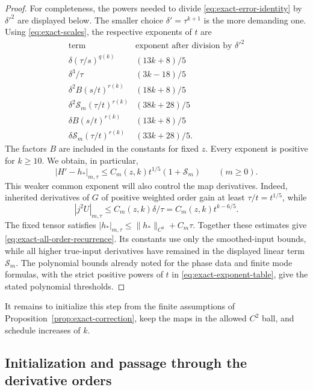 \begin{proof}
For completeness, the powers needed to divide
\eqref{eq:exact-error-identity} by $\delta'^2$ are displayed below.
The smaller choice $\delta'=\tau^{k+1}$ is the more demanding one.
Using \eqref{eq:exact-scales}, the respective exponents of $t$ are
\begin{equation}\label{eq:exact-exponent-table}
\begin{array}{c|c}
 \text{term}&\text{exponent after division by }\delta'^2\\ \hline
 \delta(\tau/s)^{q(k)}&(13k+8)/5\\
 \delta^3/\tau&(3k-18)/5\\
 \delta^2 B(s/t)^{r(k)}&(18k+8)/5\\
 \delta^2\mathcal S_m(\tau/t)^{r(k)}&(38k+28)/5\\
 \delta B(s/t)^{r(k)}&(13k+8)/5\\
 \delta\mathcal S_m(\tau/t)^{r(k)}&(33k+28)/5.
\end{array}
\end{equation}
The factors $B$ are included in the constants for fixed $z$.
Every exponent is positive for $k\ge10$.  We obtain, in particular,
\begin{equation}\label{eq:exact-defect-recurrence}
 |H'-h_*|_{m,\tau}
 \le C_m(z,k)t^{1/5}(1+\mathcal S_m)
 \qquad(m\ge0).
\end{equation}
This weaker common exponent will also control the map derivatives.
Indeed, inherited derivatives of $G$ of positive weighted order gain
at least $\tau/t=t^{1/5}$, while
\[
 |j^2U|_{m,\tau}
 \le C_m(z,k)\delta/\tau
 =C_m(z,k)t^{k-6/5}.
\]
The fixed tensor satisfies
$|h_*|_{m,\tau}\le\|h_*\|_{C^0}+C_m\tau$.
Together these estimates give
\eqref{eq:exact-all-order-recurrence}.  Its constants use only the
smoothed-input bounds, while all higher true-input derivatives have
remained in the displayed linear term $\mathcal S_m$.
The polynomial bounds already noted for the phase data and finite mode
formulas, with the strict positive powers of $t$ in
\eqref{eq:exact-exponent-table}, give the stated polynomial thresholds.
\end{proof}

It remains to initialize this step from the finite assumptions of
Proposition~\ref{prop:exact-correction}, keep the maps in the allowed
$C^2$ ball, and schedule increases of $k$.

\subsection{Initialization and passage through the derivative orders}

